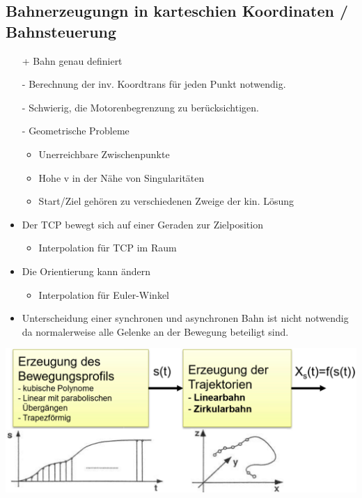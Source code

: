 \subsection{Bahnerzeugungn in karteschien Koordinaten / Bahnsteuerung }
\begin{multicols}{2}
    \begin{itemize}
        \item[+] Bahn genau definiert
    \end{itemize}
    
    \begin{itemize}
        \item[-] Berechnung der inv. Koordtrans für jeden Punkt notwendig.
        \item[-] Schwierig, die Motorenbegrenzung zu berücksichtigen.
        \columnbreak
        \item[-] Geometrische Probleme
        \begin{itemize}
            \item Unerreichbare Zwischenpunkte
            \item Hohe v in der Nähe von Singularitäten
            \item Start/Ziel gehören zu verschiedenen Zweige der kin. Lösung
        \end{itemize}
    \end{itemize}
\end{multicols}

\begin{minipage}{0.5\linewidth}
\begin{itemize}
    \item Der TCP bewegt sich auf einer Geraden zur Zielposition
    \begin{itemize}
        \item Interpolation für TCP im Raum
    \end{itemize}
\item Die Orientierung kann ändern
\begin{itemize}
    \item Interpolation für Euler-Winkel
\end{itemize}
\item Unterscheidung einer synchronen und asynchronen Bahn ist nicht notwendig da normalerweise alle Gelenke an der Bewegung beteiligt sind.
\end{itemize}
\end{minipage}
\begin{minipage}{0.5\linewidth}
    \includegraphics[width=\linewidth]{./bilder/Bahnsteuerung}
\end{minipage}

